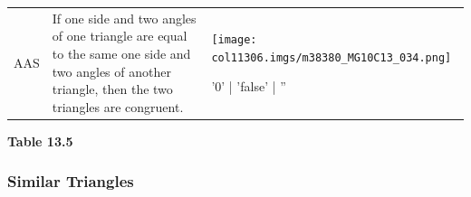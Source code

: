 \begin{table}[H]
\begin{center}
\begin{xtabular*}{\mytablewidth}[t]{|p{10\mystarwidth}|p{10\mystarwidth}|p{
10\mystarwidth}|}
    
        AAS &
    
    
        If one side and two angles of one triangle are equal to the same one
side and two angles of another triangle, then the two triangles are congruent. &
    
    
        
                    
    \setcounter{subfigure}{0}

\label{m38380*id318178}
    \begin{center}
   
\label{m38380*id318178!!!underscore!!!media}\label{
m38380*id318178!!!underscore!!!printimage}\texttt{[image: 
col11306.imgs/m38380\_MG10C13\_034.png]} %
        
      \vspace{2pt}
    \vspace{.1in}
    
    \end{center}



    \addtocounter{footnote}{-0}
    
'0' | 'false' | ''
     \tabularnewline{}
    \end{xtabular*}
      \end{center}
    \begin{center}{\small\bfseries Table 13.5}\end{center}
    
    \addtocounter{footnote}{-0}
    
    \par
  
 \pagebreak       
        \label{m38380*uid48}
        \subsubsection{ Similar Triangles}
        \nopagebreak
        

\end{table}
